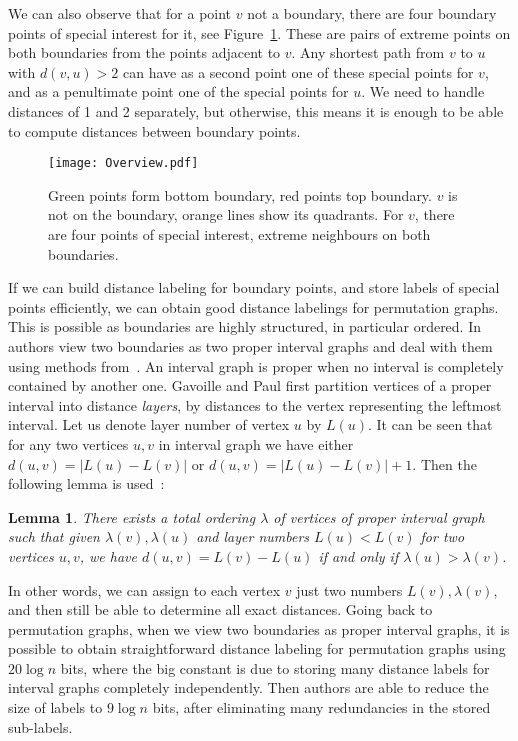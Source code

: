 \documentclass[a4paper,11pt]{article}
\newcommand{\lam}{\lambda}
\newtheorem{lemma}[theorem]{Lemma}
\begin{document}
We can also observe that for a point $v$ not a boundary, there are four boundary points of special interest for it, see Figure~\ref{Fig:Over1}.
These are pairs of extreme points on both boundaries from the points adjacent to $v$.
Any shortest path from $v$ to $u$ with $d(v,u)>2$ can have as a second point one of these special points for $v$, and as a penultimate point one of the special points for $u$.
We need to handle distances of 1 and 2 separately, but otherwise, this means it is enough to be able to compute distances between boundary points.

\begin{figure}[h]
\begin{center}
  \texttt{[image: Overview.pdf]}
\end{center}
\caption{Green points form bottom boundary, red points top boundary.
$v$ is not on the boundary, orange lines show its quadrants.
For $v$, there are four points of special interest, extreme neighbours on both boundaries.}
\label{Fig:Over1}
\end{figure}

If we can build distance labeling for boundary points, and store labels of special points efficiently, we can obtain good distance labelings for permutation graphs.
This is possible as boundaries are highly structured, in particular ordered.
In~\cite{BazzaroG05} authors view two boundaries as two proper interval graphs and deal with them using methods from~\cite{GavInterval}.
An interval graph is proper when no interval is completely contained by another one.
Gavoille and Paul first partition vertices of a proper interval into distance \emph{layers}, by distances to the vertex
representing the leftmost interval.
Let us denote layer number of vertex $u$ by $L(u)$.
It can be seen that for any two vertices $u,v$ in interval graph we have either $d(u,v)=|L(u)-L(v)|$ or $d(u,v)=|L(u)-L(v)|+1$.
Then the following lemma is used~\cite{GavInterval}:

\begin{lemma}
There exists a total ordering $\lam$ of vertices of proper interval graph such that given $\lam(v), \lam(u)$
and layer numbers $L(u) < L(v)$ for two vertices $u,v$, we have $d(u,v)=L(v)-L(u)$
if and only if $\lam(u) > \lam(v)$.
\end{lemma}

In other words, we can assign to each vertex $v$ just two numbers $L(v), \lam(v)$,
and then still be able to determine all exact distances.
Going back to permutation graphs, when we view two boundaries as proper interval graphs, it is possible to obtain
straightforward distance labeling for permutation graphs using $20\log{n}$ bits,
where the big constant is due to storing many distance labels for interval graphs completely independently.
Then authors are able to reduce the size of labels to $9\log{n}$ bits, after eliminating many redundancies in the stored sub-labels.
\end{document}
